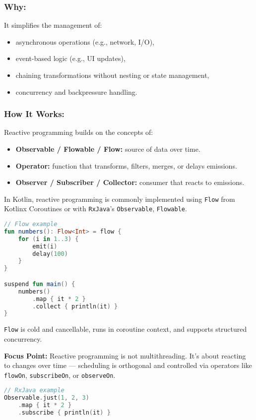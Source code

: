 \documentclass[a4paper,12pt]{article}
\begin{document}
\subsubsection{Why:}
It simplifies the management of:
\begin{itemize}
  \item asynchronous operations (e.g., network, I/O),
  \item event-based logic (e.g., UI updates),
  \item chaining transformations without nesting or state management,
  \item concurrency and backpressure handling.
\end{itemize}

\subsubsection{How It Works:}
Reactive programming builds on the concepts of:
\begin{itemize}
  \item \textbf{Observable / Flowable / Flow:} source of data over time.
  \item \textbf{Operator:} function that transforms, filters, merges, or delays emissions.
  \item \textbf{Observer / Subscriber / Collector:} consumer that reacts to emissions.
\end{itemize}

In Kotlin, reactive programming is commonly implemented using \texttt{Flow} from Kotlinx Coroutines or with \texttt{RxJava}'s \texttt{Observable}, \texttt{Flowable}.

\begin{lstlisting}[language=Kotlin]
// Flow example
fun numbers(): Flow<Int> = flow {
    for (i in 1..3) {
        emit(i)
        delay(100)
    }
}

suspend fun main() {
    numbers()
        .map { it * 2 }
        .collect { println(it) }
}
\end{lstlisting}

\texttt{Flow} is cold and cancellable, runs in coroutine context, and supports structured concurrency.

\textbf{Focus Point:} Reactive programming is not multithreading. It’s about reacting to changes over time — scheduling is orthogonal and controlled via operators like \texttt{flowOn}, \texttt{subscribeOn}, or \texttt{observeOn}.

\begin{lstlisting}[language=Kotlin]
// RxJava example
Observable.just(1, 2, 3)
    .map { it * 2 }
    .subscribe { println(it) }
\end{lstlisting}
\end{document}
